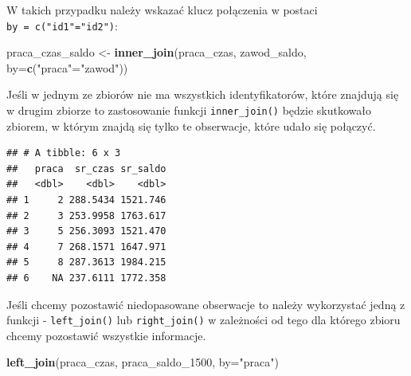 \documentclass[]{book}
\newenvironment{Shaded}{\begin{snugshade}}{\end{snugshade}}
\newcommand{\KeywordTok}[1]{\textcolor[rgb]{0.13,0.29,0.53}{\textbf{#1}}}
\newcommand{\DataTypeTok}[1]{\textcolor[rgb]{0.13,0.29,0.53}{#1}}
\newcommand{\DecValTok}[1]{\textcolor[rgb]{0.00,0.00,0.81}{#1}}
\newcommand{\StringTok}[1]{\textcolor[rgb]{0.31,0.60,0.02}{#1}}
\newcommand{\OperatorTok}[1]{\textcolor[rgb]{0.81,0.36,0.00}{\textbf{#1}}}
\newcommand{\NormalTok}[1]{#1}
\begin{document}
W takich przypadku należy wskazać klucz połączenia w postaci
\texttt{by\ =\ c("id1"="id2")}:

\begin{Shaded}
\begin{Highlighting}[]
\NormalTok{praca_czas_saldo <-}\StringTok{ }\KeywordTok{inner_join}\NormalTok{(praca_czas, zawod_saldo, }\DataTypeTok{by=}\KeywordTok{c}\NormalTok{(}\StringTok{"praca"}\NormalTok{=}\StringTok{"zawod"}\NormalTok{))}
\end{Highlighting}
\end{Shaded}

Jeśli w jednym ze zbiorów nie ma wszystkich identyfikatorów, które
znajdują się w drugim zbiorze to zastosowanie funkcji
\texttt{inner\_join()} będzie skutkowało zbiorem, w którym znajdą się
tylko te obserwacje, które udało się połączyć.

\begin{Shaded}
\end{Shaded}

\begin{verbatim}
## # A tibble: 6 x 3
##   praca  sr_czas sr_saldo
##   <dbl>    <dbl>    <dbl>
## 1     2 288.5434 1521.746
## 2     3 253.9958 1763.617
## 3     5 256.3093 1521.470
## 4     7 268.1571 1647.971
## 5     8 287.3613 1984.215
## 6    NA 237.6111 1772.358
\end{verbatim}

Jeśli chcemy pozostawić niedopasowane obserwacje to należy wykorzystać
jedną z funkcji - \texttt{left\_join()} lub \texttt{right\_join()} w
zależności od tego dla którego zbioru chcemy pozostawić wszystkie
informacje.

\begin{Shaded}
\begin{Highlighting}[]
\KeywordTok{left_join}\NormalTok{(praca_czas, praca_saldo_}\DecValTok{1500}\NormalTok{, }\DataTypeTok{by=}\StringTok{"praca"}\NormalTok{)}
\end{Highlighting}
\end{Shaded}
\end{document}
